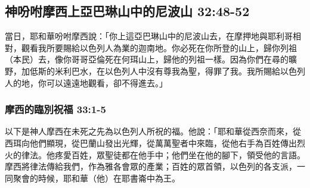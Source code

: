 \subsection{神吩咐摩西上亞巴琳山中的尼波山 32:48-52 }
當日，耶和華吩咐摩西說：「你上這亞巴琳山中的尼波山去，在摩押地與耶利哥相對，觀看我所要賜給以色列人為業的迦南地。你必死在你所登的山上，歸你列祖（本民）去，像你哥哥亞倫死在何珥山上，歸他的列祖一樣。因為你們在尋的曠野，加低斯的米利巴水，在以色列人中沒有尊我為聖，得罪了我。我所賜給以色列人的地，你可以遠遠地觀看，卻不得進去。」

\subsubsection{摩西的臨別祝福 33:1-5}
以下是神人摩西在未死之先為以色列人所祝的福。他說：「耶和華從西奈而來，從西珥向他們顯現，從巴蘭山發出光輝，從萬萬聖者中來臨，從他右手為百姓傳出烈火的律法。他疼愛百姓，眾聖徒都在他手中；他們坐在他的腳下，領受他的言語。摩西將律法傳給我們，作為雅各會眾的產業；百姓的眾首領，以色列的各支派，一同聚會的時候，耶和華（他）在耶書崙中為王。

